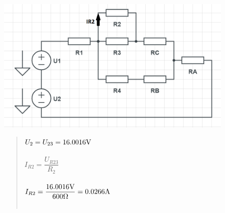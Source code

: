 \begin{figure}[H]
    \centering
    \includegraphics[scale=0.45]{pic1/u1o7.png}
    \begin{quote}
        \centering
         $U_{2} = U_{23} = 16.0016\Vo $ \\~\\
         $I_{R2} = \dfrac{U_{R23}}{R_{2}}$ \\~\\
         $I_{R2} = \dfrac{16.0016\Vo}{600\Omega} = 0.0266\Am$ \\~\\
    \end{quote}
\end{figure}
